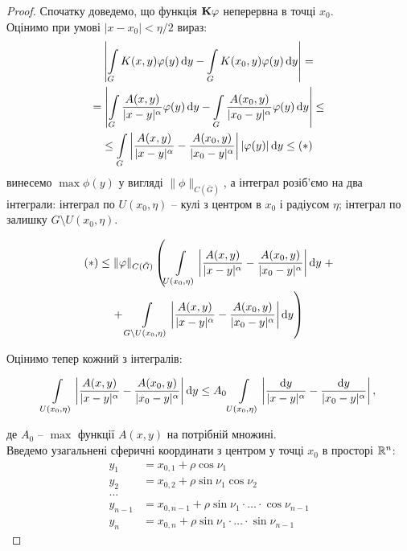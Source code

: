\begin{proof}
	Спочатку доведемо, що функція $\bf{K}\phi$ неперервна в точці $x_0$. \\

	Оцінимо при умові $|x - x_0| < \eta / 2$ вираз:
	\begin{multline*}
		\left| \Int_G K(x, y) \phi(y) \diff y - \Int_G K(x_0, y) \phi(y) \diff y \right| = \\
		= \left| \Int_G \dfrac{A(x, y)}{|x - y|^\alpha} \phi(y) \diff y - \Int_G \dfrac{A(x_0, y)}{|x_0 - y|^\alpha} \phi(y) \diff y \right| \le \\
		\le \Int_G \left|\dfrac{A(x, y)}{|x - y|^\alpha} - \dfrac{A(x_0, y)}{|x_0 - y|^\alpha}\right| |\phi(y)| \diff y \le (*)
	\end{multline*}
	винесемо $\max \phi(y)$ у вигляді $\|\phi\|_{C(\bar G)}$, а інтеграл розіб’ємо на два інтеграли: інтеграл по $U(x_0, \eta)$ -- кулі з центром в $x_0$ і радіусом $\eta$; інтеграл по залишку $G \setminus U(x_0, \eta)$.
	
	\begin{multline*} 
		(*) \le \|\phi\|_{C(\bar G)} \left( \Int_{U(x_0, \eta)} \left|\dfrac{A(x, y)}{|x - y|^\alpha} - \dfrac{A(x_0, y)}{|x_0 - y|^\alpha}\right| \diff y\right. + \\
		+ \left.\Int_{G \setminus U(x_0, \eta)} \left|\dfrac{A(x, y)}{|x - y|^\alpha} - \dfrac{A(x_0, y)}{|x_0 - y|^\alpha}\right| \diff y\right)
	\end{multline*}
	
	Оцінимо тепер кожний з інтегралів:
	
	\[ \Int_{U(x_0, \eta)} \left|\dfrac{A(x, y)}{|x - y|^\alpha} - \dfrac{A(x_0, y)}{|x_0 - y|^\alpha}\right| \diff y \le A_0 \Int_{U(x_0, \eta)} \left|\dfrac{\diff y}{|x - y|^\alpha} - \dfrac{\diff y}{|x_0 - y|^\alpha}\right|, \]

	де $A_0$ -- $\max$ функції $A(x, y)$ на потрібній множині. \\ 

	Введемо узагальнені сферичні координати з центром у точці $x_0$ в просторі $\RR^n$:
	\begin{align*} 
		y_1 &= x_{0, 1} + \rho \cos \nu_1 \\
		y_2 &= x_{0, 2} + \rho \sin \nu_1 \cos \nu_2 \\
		\ldots \\
		y_{n - 1} &= x_{0, n - 1} + \rho \sin \nu_1 \cdot \ldots \cdot \cos \nu_{n - 1} \\
		y_n &= x_{0, n} + \rho \sin \nu_1 \cdot \ldots \cdot \sin \nu_{n - 1}
	\end{align*}


\end{proof}
